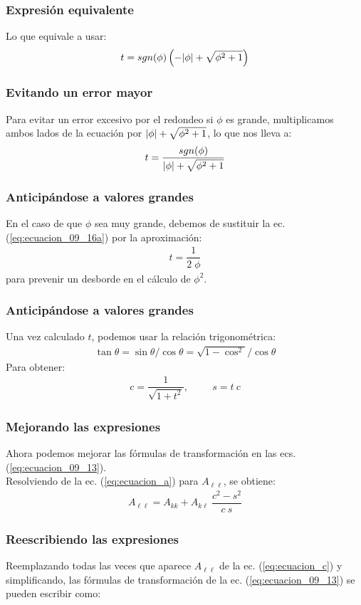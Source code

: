 \documentclass[12pt]{beamer}
\begin{document}
\begin{frame}
\frametitle{Expresión equivalente}
Lo que equivale a usar:
\pause
\begin{align*}
t = sgn(\phi) \left( - \abs{\phi} + \sqrt{\phi^{2} + 1} \right)
\end{align*}
\end{frame}
\begin{frame}
\frametitle{Evitando un error mayor}
Para evitar un error excesivo por el redondeo si $\phi$ es grande, multiplicamos ambos lados de la ecuación por $\abs{\phi} + \sqrt{\phi^{2} + 1}$, lo que nos lleva a:
\pause
\begin{align}
t = \dfrac{sgn(\phi)}{\abs{\phi} + \sqrt{\phi^{2} + 1}}
\label{eq:ecuacion_09_16a}
\end{align}
\end{frame}
\begin{frame}
\frametitle{Anticipándose a valores grandes}
En el caso de que $\phi$ sea muy grande, debemos de sustituir la ec. (\ref{eq:ecuacion_09_16a}) por la aproximación:
\pause
\begin{align}
t = \dfrac{1}{2 \; \phi}
\label{eq:ecuacion_09_16b}
\end{align}
para prevenir un desborde en el cálculo de $\phi^{2}$.
\end{frame}
\begin{frame}
\frametitle{Anticipándose a valores grandes}
Una vez calculado $t$, podemos usar la relación trigonométrica:
\pause
\begin{align*}
\tan \theta = \sin \theta / \cos \theta = \sqrt{1 - \cos^{2}} / \cos \theta
\end{align*}
Para obtener:
\pause
\begin{align}
c = \dfrac{1}{\sqrt{1 + t^{2}}},\hspace{1cm} s = t \: c
\label{eq:ecuacion_09_17}
\end{align}
\end{frame}
\begin{frame}
\frametitle{Mejorando las expresiones}
Ahora podemos mejorar las fórmulas de transformación en las ecs. (\ref{eq:ecuacion_09_13}).
\\
\bigskip
\pause
Resolviendo de la ec. (\ref{eq:ecuacion_a}) para $A_{\ell \ell}$, se obtiene:
\pause
\begin{align}
A_{\ell \ell} = A_{k k} + A_{k \ell} \: \dfrac{c^{2} - s^{2}}{c \: s}
\label{eq:ecuacion_c}
\end{align}
\end{frame}
\begin{frame}
\frametitle{Reescribiendo las expresiones}
Reemplazando todas las veces que aparece $A_{\ell \ell}$ de la ec. (\ref{eq:ecuacion_c}) y simplificando, las fórmulas de transformación de la ec. (\ref{eq:ecuacion_09_13}) se pueden escribir como:
\end{frame}
\end{document}
